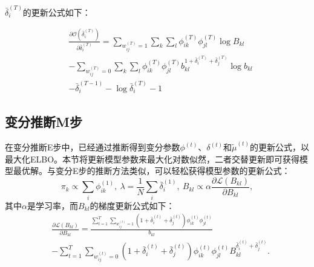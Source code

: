 $\bar{\delta}_i^{(T)}$的更新公式如下：



\begin{equation}
\begin{split}
& \frac{\partial \mathscr{O}(\bar{\delta}_i^{(T)})}{\partial \bar{\delta}_i^{(T)}}  = \sum_{w_{ij}^{(T)}=1} \sum_k \sum_l \phi_{ik}^{(T)}\phi_{jl}^{(T)} \log B_{kl} \\
& -\sum_{w_{ij}^{(T)}=0} \sum_k \sum_l \phi_{ik}^{(T)}\phi_{jl}^{(T)}  b_{kl}^{1+\bar{\delta}_i^{(T)}+\bar{\delta}_j^{(T)}} \log b_{kl} \\
&  -\bar{\delta}_i^{(T-1)} - \log \bar{\delta}_i^{(T)} -1
\end{split}
\label{eq:deltaT}
\end{equation}

\subsection{变分推断M步}
在变分推断E步中，已经通过推断得到变分参数$\phi^{(t)}$、$\delta^{(t)}$和$\tilde{\mu}^{(t)}$的更新公式，以最大化ELBO。本节将更新模型参数来最大化对数似然，二者交替更新即可获得模型最优解。与变分E步的推断方法类似，可以轻松获得模型参数的更新公式：
\begin{equation}
\pi_k \propto \sum_i \phi_{ik}^{(1)},~\lambda = \frac{1}{N} \sum_i \bar{\delta}_i^{(1)},~B_{kl} \propto \alpha \frac{\partial \mathscr{L}(B_{kl})}{\partial B_{kl}},
\label{eq:pi}
\end{equation}
其中$\alpha$是学习率，而$B_{kl}$的梯度更新公式如下：
\begin{align}
& \frac{\partial \mathscr{L}(B_{kl})}{\partial B_{kl}}= \frac{\sum_{t=1}^T \sum_{w_{ij}^{(t)}=1}(1+\bar{\delta}_i^{(t)}+\bar{\delta}_j^{(t)}) \phi_{ik}^{(t)} \phi_{jl}^{(t)}}{b_{kl}}\nonumber \\
& -\sum_{t=1}^T \sum_{w_{ij}^{(t)}=0}(1+\bar{\delta}_i^{(t)}+\bar{\delta}_j^{(t)}) \phi_{ik}^{(t)} \phi_{jl}^{(t)} B_{kl}^{ \bar{\delta}_i^{(t)}+\bar{\delta}_j^{(t)}}.
\label{eq:B}
\end{align}

